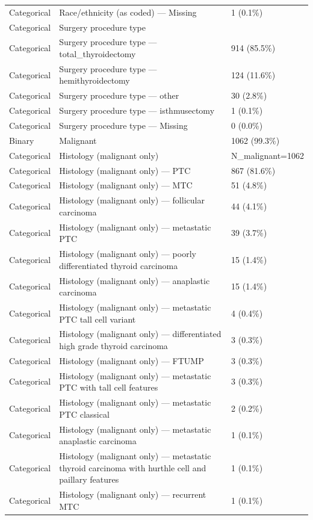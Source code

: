 \begin{table}[htbp]
\begin{tabular}{lll}
Categorical & Race/ethnicity (as coded) — Missing & 1 (0.1\%) \\
Categorical & Surgery procedure type &  \\
Categorical & Surgery procedure type — total\_thyroidectomy & 914 (85.5\%) \\
Categorical & Surgery procedure type — hemithyroidectomy & 124 (11.6\%) \\
Categorical & Surgery procedure type — other & 30 (2.8\%) \\
Categorical & Surgery procedure type — isthmusectomy & 1 (0.1\%) \\
Categorical & Surgery procedure type — Missing & 0 (0.0\%) \\
Binary & Malignant & 1062 (99.3\%) \\
Categorical & Histology (malignant only) & N\_malignant=1062 \\
Categorical & Histology (malignant only) — PTC & 867 (81.6\%) \\
Categorical & Histology (malignant only) — MTC & 51 (4.8\%) \\
Categorical & Histology (malignant only) — follicular carcinoma & 44 (4.1\%) \\
Categorical & Histology (malignant only) — metastatic PTC & 39 (3.7\%) \\
Categorical & Histology (malignant only) — poorly differentiated thyroid carcinoma & 15 (1.4\%) \\
Categorical & Histology (malignant only) — anaplastic carcinoma & 15 (1.4\%) \\
Categorical & Histology (malignant only) — metastatic PTC tall cell variant & 4 (0.4\%) \\
Categorical & Histology (malignant only) — differentiated high grade thyroid carcinoma & 3 (0.3\%) \\
Categorical & Histology (malignant only) — FTUMP & 3 (0.3\%) \\
Categorical & Histology (malignant only) — metastatic PTC with tall cell features & 3 (0.3\%) \\
Categorical & Histology (malignant only) — metastatic PTC classical & 2 (0.2\%) \\
Categorical & Histology (malignant only) — metastatic anaplastic carcinoma & 1 (0.1\%) \\
Categorical & Histology (malignant only) — metastatic thyroid carcinoma with hurthle cell and paillary features & 1 (0.1\%) \\
Categorical & Histology (malignant only) — recurrent MTC & 1 (0.1\%) \\

\end{tabular}
\end{table}

